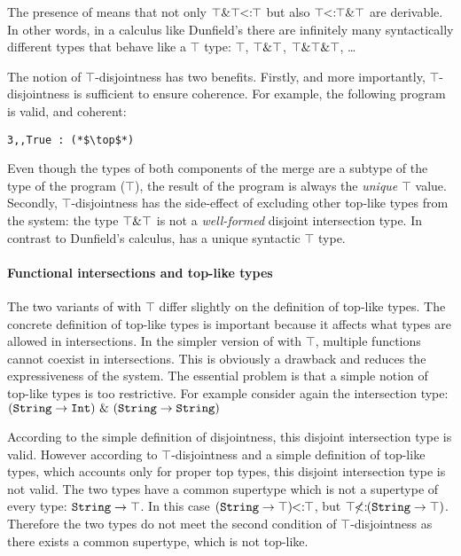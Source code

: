 \noindent The presence of   means that not only  
${\top\& \top} \!\!<:\!\! {\top}$ but also 
${\top} \!\!<:\!\! {\top \& \top}$ are derivable.
In other words, in a calculus like Dunfield's there are infinitely
many syntactically different types that behave like a $\top$ type: 
$\top$, $\top \& \top$, $\top \& \top \& \top$, \ldots

The notion of $\top$-disjointness has two benefits. Firstly, and more
importantly, $\top$-disjointness is sufficient to ensure
coherence. For example, the following program is valid, and coherent:

\begin{lstlisting}
3,,True : (*$\top$*) 
\end{lstlisting}

\noindent Even though the types of both components of the merge are a
subtype of the type of the program ($\top$), the result of the
program is always the \emph{unique} $\top$ value. Secondly,
$\top$-disjointness has the side-effect of excluding other top-like
types from the system: the type $\top \& \top$ is not
a \emph{well-formed} disjoint intersection type. In contrast to Dunfield's
calculus, \name has a unique syntactic $\top$ type.

\paragraph{Functional intersections and top-like types}
The two variants of \name with $\top$ differ slightly on the
definition of top-like types. The concrete definition of top-like 
types is important because it affects what types are allowed in intersections.
In the simpler version of \name with $\top$, multiple
functions cannot coexist in intersections. This is obviously a drawback and 
reduces the expressiveness of the system. The essential
problem is that a simple notion of top-like types is too restrictive. 
For example consider again the intersection type: \\

$(\texttt{String} \to \texttt{Int})~\&~(\texttt{String} \to  \texttt{String})$
\vspace{5pt}

\noindent According to the simple definition of disjointness, this disjoint
intersection type is valid. However according to $\top$-disjointness and a simple definition
of top-like types, which accounts only for proper top types, this disjoint intersection type is not valid. 
The two types have a common supertype which is not a supertype of
every type: $\texttt{String} \to \top$. In this case $(\texttt{String} \to
\top)\!\!<:\!\!\top$, but $\top\!\!\not<:\!\!(\texttt{String} \to
\top)$. Therefore the two types do not meet the second condition of
$\top$-disjointness as there exists a common supertype, which is not top-like.

